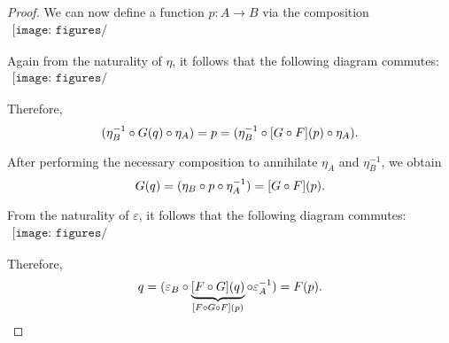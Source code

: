 \begin{proof}
  We can now define a function \( p: A \to B \) via the composition
  \begin{equation}\label{eq:thm:category_equivalence_is_fully_faithful_and_essentially_surjective/fullness/def}
    \begin{aligned}
      \texttt{[image: figures/thm\_\_category\_equivalence\_is\_fully\_faithful\_and\_essentially\_surjective.pdf]}
    \end{aligned}
  \end{equation}

  Again from the naturality of \( \eta \), it follows that the following diagram commutes:
  \begin{equation}\label{eq:thm:category_equivalence_is_fully_faithful_and_essentially_surjective/fullness/nat_eta}
    \begin{aligned}
      \texttt{[image: figures/thm\_\_category\_equivalence\_is\_fully\_faithful\_and\_essentially\_surjective.pdf]}
    \end{aligned}
  \end{equation}

  Therefore,
  \begin{equation*}
    (\eta_B^{-1} \bincirc G(q) \bincirc \eta_A) = p = (\eta_B^{-1} \bincirc [G \bincirc F](p) \bincirc \eta_A).
  \end{equation*}

  After performing the necessary composition to annihilate \( \eta_A \) and \( \eta_B^{-1} \), we obtain
  \begin{equation*}
     G(q) = (\eta_B \bincirc p \bincirc \eta_A^{-1}) = [G \bincirc F](p).
  \end{equation*}

  From the naturality of \( \varepsilon \), it follows that the following diagram commutes:
  \begin{equation}\label{eq:thm:category_equivalence_is_fully_faithful_and_essentially_surjective/fullness/nat_varepsilon}
    \begin{aligned}
      \texttt{[image: figures/thm\_\_category\_equivalence\_is\_fully\_faithful\_and\_essentially\_surjective.pdf]}
    \end{aligned}
  \end{equation}

  Therefore,
  \begin{equation*}
   q = (\varepsilon_B \bincirc \underbrace{[F \bincirc G](q)}_{[F \bincirc G \bincirc F](p)} \bincirc \varepsilon_A^{-1}) = F(p).
  \end{equation*}
\end{proof}

